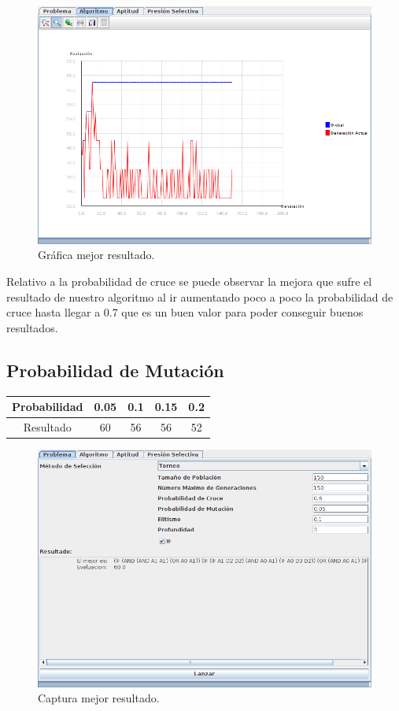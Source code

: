 \documentclass[12pt]{article}
\begin{document}
\begin{figure}[H]
\centering
\includegraphics[scale=0.4]{graficas/pcg64}
\caption{Gráfica mejor resultado.}
\end{figure}

Relativo a la probabilidad de cruce se puede observar la mejora que sufre el resultado de nuestro algoritmo al ir aumentando poco a poco la probabilidad de cruce hasta llegar a 0.7 que es un buen valor para poder conseguir buenos resultados.	

	

\subsection{Probabilidad de Mutación}
\begin{table}[H]
\begin{center}
\begin{tabular}{|ccccc|} \hline
Probabilidad   & 0.05 & 0.1 & 0.15 & 0.2 \\  \hline
Resultado  &  60 & 56 & 56 & 52 \\ \hline
\end{tabular}
\end{center}
\end{table}

\begin{figure}[H]
\centering
\includegraphics[scale=0.4]{graficas/pm60}
\caption{Captura mejor resultado.}
\end{figure}
\end{document}
